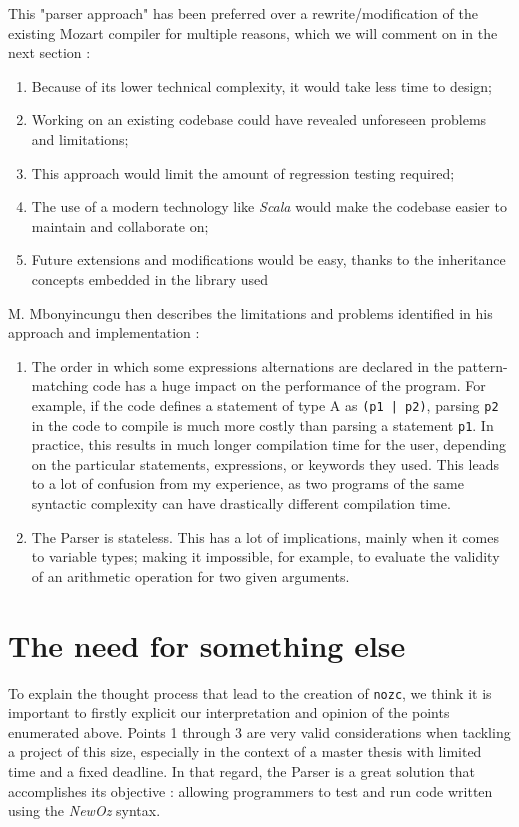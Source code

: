 This "parser approach" has been preferred over a rewrite/modification of the existing Mozart compiler for multiple reasons, which we will comment on in the next section :
\begin{enumerate}
    \item Because of its lower technical complexity, it would take less time to design;
    \item Working on an existing codebase could have revealed unforeseen problems and limitations;
    \item This approach would limit the amount of regression testing required;
    \item The use of a modern technology like \textit{Scala} would make the codebase easier to maintain and collaborate on;
    \item Future extensions and modifications would be easy, thanks to the inheritance concepts embedded in the library used
\end{enumerate}
M. Mbonyincungu then describes the limitations and problems identified in his approach and implementation :
\begin{enumerate}[resume]
    \item The order in which some expressions alternations are declared in the pattern-matching code has a huge impact on the performance of the program.
    For example, if the code defines a statement of type A as \texttt{(p1 | p2)}, parsing \texttt{p2} in the code to compile is much more costly than parsing a statement \texttt{p1}.
    In practice, this results in much longer compilation time for the user, depending on the particular statements, expressions, or keywords they used.
    This leads to a lot of confusion from my experience, as two programs of the same syntactic complexity can have drastically different compilation time.
    \item The Parser is stateless.
    This has a lot of implications, mainly when it comes to variable types;
    making it impossible, for example, to evaluate the validity of an arithmetic operation for two given arguments.
\end{enumerate}

\section{The need for something else}\label{sec:ch3-problems}
To explain the thought process that lead to the creation of \texttt{nozc}, we think it is important to firstly explicit our interpretation and opinion of the points enumerated above.
Points 1 through 3 are very valid considerations when tackling a project of this size, especially in the context of a master thesis with limited time and a fixed deadline.
In that regard, the Parser is a great solution that accomplishes its objective : allowing programmers to test and run code written using the \textit{NewOz} syntax.\newline


